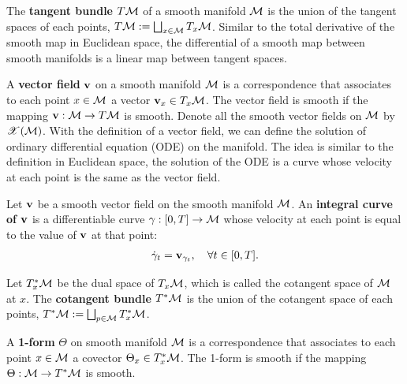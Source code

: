 The \textbf{tangent bundle $T\mathcal{M}$} of a smooth manifold $\mathcal{M}$ is the union of the tangent spaces of each points, \ie $T\mathcal{M}:=\bigsqcup_{x\in \mathcal{M}}T_x\mathcal{M}$.
Similar to the total derivative of the smooth map in Euclidean space, the differential of a smooth map between smooth manifolds is a linear map between tangent spaces.

A \textbf{vector field} $\mathbf{v}$ on a smooth manifold $\mathcal{M}$ is a correspondence that associates to each point $x\in\mathcal{M}$ a vector $\mathbf{v}_x\in T_x\mathcal{M}$. The vector field is smooth if the mapping $\mathbf{v}:\mathcal{M}\to T\mathcal{M}$ is smooth. Denote all the smooth vector fields on $\mathcal{M}$ by $\mathscr{X}(\mathcal{M})$. With the definition of a vector field, we can define the solution of ordinary differential equation (ODE) on the manifold. The idea is similar to the definition in Euclidean space, the solution of the ODE is a curve whose velocity at each point is the same as the vector field.
\begin{definition}
    Let $\mathbf{v}$ be a smooth vector field on the smooth manifold $\mathcal{M}$. An \textbf{integral curve of $\mathbf{v}$} is a differentiable curve $\gamma:[0,T]\to\mathcal{M}$ whose velocity at each point is equal to the value of $\mathbf{v}$ at that point:
    \begin{align}
        \dot{\gamma}_t = \mathbf{v}_{\gamma_t}, \quad\forall t\in [0,T].
    \end{align}
\end{definition}
Let $T^*_x\mathcal{M}$ be the dual space of $T_x\mathcal{M}$, which is called the cotangent space of $\mathcal{M}$ at $x$. The \textbf{cotangent bundle $T^*\mathcal{M}$} is the union of the cotangent space of each points, \ie $T^*\mathcal{M}:=\bigsqcup_{p\in \mathcal{M}} T^*_x\mathcal{M}$.
\begin{definition}\label{def:1-form}
    A \textbf{1-form} $\Theta$ on smooth manifold $\mathcal{M}$ is a correspondence that associates to each point $x\in\mathcal{M}$ a covector $\Theta_x\in T^*_x\mathcal{M}$. The 1-form is smooth if the mapping $\Theta:\mathcal{M}\to T^*\mathcal{M}$ is smooth. 
\end{definition}

